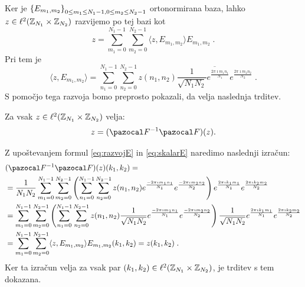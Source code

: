 Ker je $\left\{E_{m_1, m_2}\right\}_{0 \leq m_1 \leq N_1 - 1, 0 \leq m_2 \leq N_2 - 1}$ ortonormirana baza, lahko $z \in \ell^2(\mathbb Z_{N_1} \times \mathbb Z_{N_2})$ razvijemo po tej bazi kot
\begin{equation}\label{eq:razvojE}
z = \sum_{m_1 = 0}^{N_1 - 1} \sum_{m_2 = 0}^{N_2 - 1} \langle z, E_{m_1, m_2} \rangle E_{m_1, m_2} \;.
\end{equation}
Pri tem je
\begin{equation}\label{eq:skalarE}
\langle z, E_{m_1, m_2}\rangle = \sum_{n_1 = 0}^{N_1 - 1} \sum_{n_2 = 0}^{N_2 - 1} z(n_1, n_2) \overline{\frac{1}{\sqrt{N_1N_2}} e^{\frac{2\pi \imath m_1n_1}{N_1}} e^{\frac{2\pi \imath m_2n_2}{N_2}}} \;.
\end{equation}
%
S pomočjo tega razvoja bomo preprosto pokazali, da velja naslednja trditev.
%
\begin{trditev}\label{trd:obratnoLevo}
Za vsak $z \in \ell^2(\mathbb Z_{N_1} \times \mathbb Z_{N_2})$ velja:
$$z = (\F^{-1}\F)(z).$$
\end{trditev}
%
\begin{dokaz}
Z upoštevanjem formul \eqref{eq:razvojE} in \eqref{eq:skalarE} naredimo naslednji izračun:
%
\begin{align*}
 & (\F^{-1} \F)(z)(k_1, k_2) = \\
 & = \frac{1}{N_1N_2} \sum_{m_1 = 0}^{N_1 - 1} \sum_{m_2 = 0}^{N_2 - 1} \left(\sum_{n_1 = 0}^{N_1 - 1} \sum_{n_2 = 0}^{N_2 - 1} z(n_1, n_2) e^{\frac{-2\pi \imath m_1n_1}{N_1}} e^{\frac{-2\pi \imath m_2n_2}{N_2}}\right) e^{\frac{2\pi \imath k_1m_1}{N_1}} e^{\frac{2\pi \imath k_2m_2}{N_2}} \\
 & = \sum_{m_1 = 0}^{N_1 - 1} \sum_{m_2 = 0}^{N_2 - 1} \left(\sum_{n_1 = 0}^{N_1 - 1} \sum_{n_2 = 0}^{N_2 - 1} z(n_1, n_2) \frac{1}{\sqrt{N_1N_2}} e^{\frac{-2\pi \imath m_1n_1}{N_1}} e^{\frac{-2\pi \imath m_2n_2}{N_2}}\right) \frac{1}{\sqrt{N_1N_2}} e^{\frac{2\pi \imath k_1m_1}{N_1}} e^{\frac{2\pi \imath k_2m_2}{N_2}} \\
 & = \sum_{m_1 = 0}^{N_1 - 1} \sum_{m_2 = 0}^{N_2 - 1} \langle z, E_{m_1, m_2} \rangle E_{m_1, m_2}(k_1, k_2) = z(k_1, k_2) \;.
\end{align*}
%
Ker ta izračun velja za vsak par $(k_1, k_2) \in \ell^2(\mathbb Z_{N_1} \times \mathbb Z_{N_2})$, je trditev s tem dokazana.
\end{dokaz}
%
